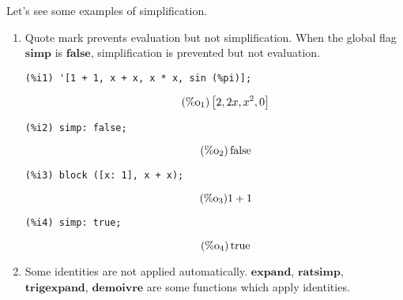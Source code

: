 \documentclass[12pt,leqno]{article}
\begin{document}
Let's see some examples of simplification.

\begin{enumerate}

\item Quote mark prevents evaluation but not simplification.
When the global flag $\mathbf{simp}$ is $\mathbf{false}$,
simplification is prevented but not evaluation.

\begin{verbatim}
(%i1) '[1 + 1, x + x, x * x, sin (%pi)];
\end{verbatim}
\begin{equation}
\tag{$\mathop{\mathrm{\%o}}_{1}$}\left[2, 2 x, {x}^{2}, 0\right]
\label{eq:doc-group1-code21-1-1}
\end{equation}
\begin{verbatim}
(%i2) simp: false;
\end{verbatim}
\begin{equation}
\tag{$\mathop{\mathrm{\%o}}_{2}$}\mathop{\mathrm{false}}
\label{eq:doc-group1-code21-2-1}
\end{equation}
\begin{verbatim}
(%i3) block ([x: 1], x + x);
\end{verbatim}
\begin{equation}
\tag{$\mathop{\mathrm{\%o}}_{3}$}1+1
\label{eq:doc-group1-code21-3-1}
\end{equation}
\begin{verbatim}
(%i4) simp: true;
\end{verbatim}
\begin{equation}
\tag{$\mathop{\mathrm{\%o}}_{4}$}\mathop{\mathrm{true}}
\label{eq:doc-group1-code21-4-1}
\end{equation}


\item Some identities are not applied automatically.
$\mathbf{expand}$, $\mathbf{ratsimp}$, $\mathbf{trigexpand}$, $\mathbf{demoivre}$
are some functions which apply identities.


\end{enumerate}
\end{document}
